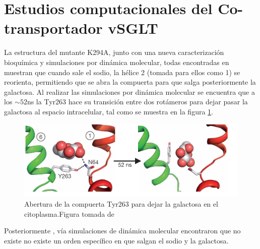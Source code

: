 \section{Estudios computacionales del Co-transportador vSGLT}
La estructura del mutante K294A, junto con una nueva caracterizaci\'{o}n bioqu\'{i}mica y simulaciones por din\'{a}mica molecular, todas encontradas en \cite{Watanabe2010} muestran que cuando sale el sodio, la h\'{e}lice 2 (tomada para ellos como 1) se reorienta, permitiendo que se abra la compuerta para que salga posteriormente la galactosa. Al realizar las simulaciones por din\'{a}mica molecular se encuentra que a los $\sim 52$ns la Tyr263 hace su transici\'{o}n entre dos rot\'{a}meros para dejar pasar la galactosa al espacio intracelular,  tal como se muestra en la figura \ref{fig:Y263}.\\
\begin{figure}[ht]
\centering%
\includegraphics[scale=0.5]{Kap3/Y263.png}%
\caption{Abertura de la compuerta Tyr263 para dejar la galactosa en el citoplasma.Figura tomada de \cite{Watanabe2010}} \label{fig:Y263}
\end{figure}
Posteriormente \cite{Adelman2016}, v\'{i}a simulaciones de din\'{a}mica molecular  encontraron que no existe no existe un orden espec\'{i}fico en que salgan el sodio y la galactosa.